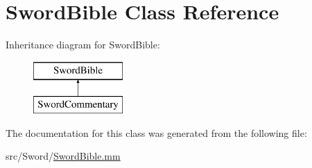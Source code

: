 \hypertarget{class_sword_bible}{\section{Sword\-Bible Class Reference}
\label{class_sword_bible}
}
Inheritance diagram for Sword\-Bible\-:\begin{figure}[H]
\begin{center}
\leavevmode
\includegraphics[height=2.000000cm]{class_sword_bible}
\end{center}
\end{figure}


The documentation for this class was generated from the following file\-:\begin{DoxyCompactItemize}
\item 
src/\-Sword/\hyperlink{_sword_bible_8mm}{Sword\-Bible.\-mm}\end{DoxyCompactItemize}
